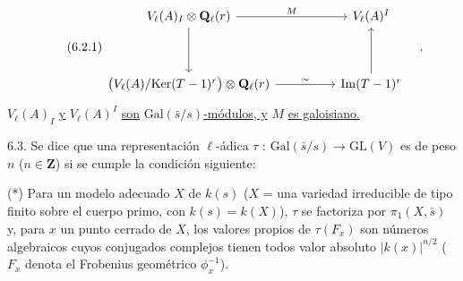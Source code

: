 \begin{equation}\tag{6.2.1}
\begin{tikzcd}[column sep=huge, row sep=huge]
V_{\ell}(A)_{I} \otimes \mathbf{Q}_{\ell}(r) \arrow[r, "M"] \arrow[d] & V_{\ell}(A)^{I} \\
\sisi{V_{\ell}(A)/\mathrm{Ker}(T-1)^{r} \otimes \mathbf{Q}_{\ell}(r)}{\bigl(V_{\ell}(A)/\mathrm{Ker}(T-1)^{r}\bigr) \otimes \mathbf{Q}_{\ell}(r)} \arrow[r, "\sim"] & \mathrm{Im}(T-1)^{r} \arrow[u]
\end{tikzcd}\quad .
\end{equation}
$V_{\ell}(A)_{I}$ \underline{y} $V_{\ell}(A)^{I}$ \underline{son} $\mathrm{Gal}(\bar{s}/s)$\underline{-módulos, y} $M$ \underline{es galoisiano.}

6.3. Se dice que una representación $\ell$-ádica $\tau$ : $\mathrm{Gal}(\bar{s}/s) \longrightarrow \mathrm{GL}(V)$ es de peso $n$ ($n \in \mathbf{Z}$) si se cumple la condición siguiente:

(*) Para un modelo adecuado $X$ de $k(s)$ ($X$ = una variedad irreducible de tipo finito sobre el cuerpo primo, con $k(s) = k(X)$), $\tau$ se factoriza por $\pi_{1}(X,\bar{s})$ y, para $x$ un punto cerrado de $X$, los valores propios de $\tau(F_{x})$ son números algebraicos cuyos conjugados complejos tienen todos valor absoluto $|k(x)|^{n/2}$ ($F_{x}$ denota el Frobenius geométrico $\phi_{x}^{-1}$).


